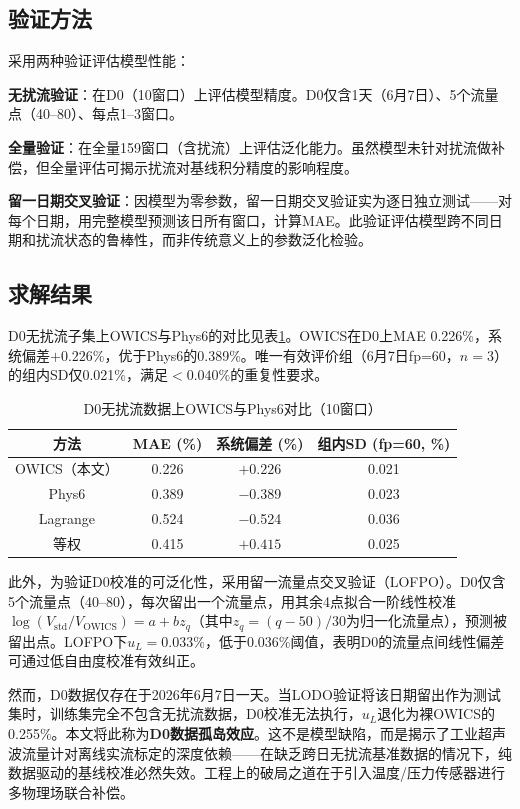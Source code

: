 \subsection{验证方法}

采用两种验证评估模型性能：

\textbf{无扰流验证}：在D0（10窗口）上评估模型精度。D0仅含1天（6月7日）、5个流量点（40--80）、每点1--3窗口。

\textbf{全量验证}：在全量159窗口（含扰流）上评估泛化能力。虽然模型未针对扰流做补偿，但全量评估可揭示扰流对基线积分精度的影响程度。

\textbf{留一日期交叉验证}：因模型为零参数，留一日期交叉验证实为逐日独立测试——对每个日期，用完整模型预测该日所有窗口，计算MAE。此验证评估模型跨不同日期和扰流状态的鲁棒性，而非传统意义上的参数泛化检验。

\subsection{求解结果}

D0无扰流子集上OWICS与Phys6的对比见表\ref{tab:q2_d0_compare}。OWICS在D0上MAE 0.226\%，系统偏差$+0.226\%$，优于Phys6的0.389\%。唯一有效评价组（6月7日fp=60，$n=3$）的组内SD仅0.021\%，满足$<0.040\%$的重复性要求。

\begin{table}[H]
\centering
\caption{D0无扰流数据上OWICS与Phys6对比（10窗口）}
\label{tab:q2_d0_compare}
\begin{tabular}{cccc}
\toprule
方法 & MAE (\%) & 系统偏差 (\%) & 组内SD (fp=60, \%) \\
\midrule
OWICS（本文） & 0.226 & $+0.226$ & 0.021 \\
Phys6 & 0.389 & $-$0.389 & 0.023 \\
Lagrange & 0.524 & $-$0.524 & 0.036 \\
等权 & 0.415 & $+0.415$ & 0.025 \\
\bottomrule
\end{tabular}
\end{table}

此外，为验证D0校准的可泛化性，采用留一流量点交叉验证（LOFPO）。D0仅含5个流量点（40--80），每次留出一个流量点，用其余4点拟合一阶线性校准$\log(V_{\text{std}}/V_{\text{OWICS}}) = a + b z_q$（其中$z_q = (q-50)/30$为归一化流量点），预测被留出点。LOFPO下$u_L = 0.033\%$，低于0.036\%阈值，表明D0的流量点间线性偏差可通过低自由度校准有效纠正。

然而，D0数据仅存在于2026年6月7日一天。当LODO验证将该日期留出作为测试集时，训练集完全不包含无扰流数据，D0校准无法执行，$u_L$退化为裸OWICS的0.255\%。本文将此称为\textbf{D0数据孤岛效应}。这不是模型缺陷，而是揭示了工业超声波流量计对离线实流标定的深度依赖——在缺乏跨日无扰流基准数据的情况下，纯数据驱动的基线校准必然失效。工程上的破局之道在于引入温度/压力传感器进行多物理场联合补偿。

